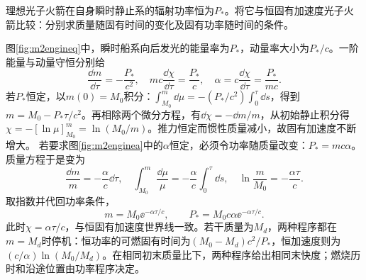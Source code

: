 \begin{exercise}\label{ex:m2powerengine}
理想光子火箭在自身瞬时静止系的辐射功率恒为$P_*$。将它与恒固有加速度光子火箭比较：分别求质量随固有时间的变化及固有功率随时间的条件。
\end{exercise}
\begin{solution}
图\ref{fig:m2engineq}中，瞬时船系向后发光的能量率为$P_*$，动量率大小为$P_*/c$。一阶能量与动量守恒分别给
\[
 \frac{\dd m}{\dd\tau}=-\frac{P_*}{c^2},\quad
 mc\frac{\dd\chi}{\dd\tau}=\frac{P_*}{c},\quad
 \alpha=c\frac{\dd\chi}{\dd\tau}=\frac{P_*}{mc}.
\]
若$P_*$恒定，以$m(0)=M_0$积分：$\int_{M_0}^{m}\dd\mu=-(P_*/c^2)\int_0^\tau\dd s$，得到$m=M_0-P_*\tau/c^2$。再相除两个微分方程，有$\dd\chi=-\dd m/m$，从初始静止积分得$\chi=-[\ln\mu]_{M_0}^{m}=\ln(M_0/m)$。推力恒定而惯性质量减小，故固有加速度不断增大。
若要求图\ref{fig:m2enginea}中的$\alpha$恒定，必须令功率随质量改变：$P_*=mc\alpha$。质量方程于是变为
\[
 \frac{\dd m}{m}=-\frac\alpha c\dd\tau,
 \quad \int_{M_0}^{m}\frac{\dd\mu}{\mu}
 =-\frac\alpha c\int_0^\tau\dd s,
 \quad \ln\frac m{M_0}=-\frac{\alpha\tau}c.
\]
取指数并代回功率条件，
\[
 m=M_0\ee^{-\alpha\tau/c},\qquad
 P_*=M_0c\alpha\ee^{-\alpha\tau/c}.
\]
此时$\chi=\alpha\tau/c$，与恒固有加速度世界线一致。若干质量为$M_d$，两种程序都在$m=M_d$时停机：恒功率的可燃固有时间为$(M_0-M_d)c^2/P_*$，恒加速度则为$(c/\alpha)\ln(M_0/M_d)$。在相同初末质量比下，两种程序给出相同末快度；燃烧历时和沿途位置由功率程序决定。
\end{solution}

